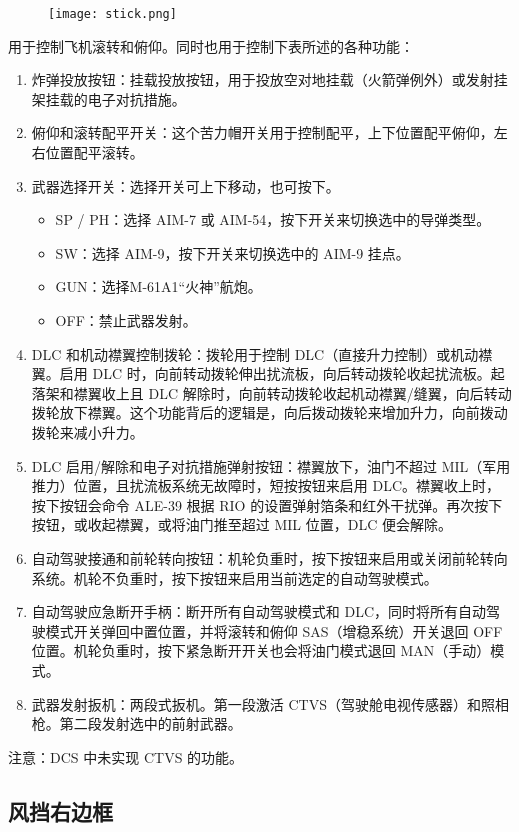 \begin{figure}[htb]
  \center
  \texttt{[image: stick.png]}
\end{figure}
用于控制飞机滚转和俯仰。同时也用于控制下表所述的各种功能：

\begin{enumerate}
  \item 炸弹投放按钮：挂载投放按钮，用于投放空对地挂载（火箭弹例外）或发射挂架挂载的电子对抗措施。
  \item 俯仰和滚转配平开关：这个苦力帽开关用于控制配平，上下位置配平俯仰，左右位置配平滚转。
  \item 武器选择开关：选择开关可上下移动，也可按下。
  \begin{itemize}
    \item SP / PH：选择 AIM-7 或 AIM-54，按下开关来切换选中的导弹类型。
    \item SW：选择 AIM-9，按下开关来切换选中的 AIM-9 挂点。
    \item GUN：选择M-61A1“火神”航炮。
    \item OFF：禁止武器发射。
  \end{itemize}
  \item DLC 和机动襟翼控制拨轮：拨轮用于控制 DLC（直接升力控制）或机动襟翼。启用 DLC 时，向前转动拨轮伸出扰流板，向后转动拨轮收起扰流板。起落架和襟翼收上且 DLC 解除时，向前转动拨轮收起机动襟翼/缝翼，向后转动拨轮放下襟翼。这个功能背后的逻辑是，向后拨动拨轮来增加升力，向前拨动拨轮来减小升力。
  \item DLC 启用/解除和电子对抗措施弹射按钮：襟翼放下，油门不超过 MIL（军用推力）位置，且扰流板系统无故障时，短按按钮来启用 DLC。襟翼收上时，按下按钮会命令 ALE-39 根据 RIO 的设置弹射箔条和红外干扰弹。再次按下按钮，或收起襟翼，或将油门推至超过 MIL 位置，DLC 便会解除。
  \item 自动驾驶接通和前轮转向按钮：机轮负重时，按下按钮来启用或关闭前轮转向系统。机轮不负重时，按下按钮来启用当前选定的自动驾驶模式。
  \item 自动驾驶应急断开手柄：断开所有自动驾驶模式和 DLC，同时将所有自动驾驶模式开关弹回中置位置，并将滚转和俯仰 SAS（增稳系统）开关退回 OFF 位置。机轮负重时，按下紧急断开开关也会将油门模式退回 MAN（手动）模式。
  \item 武器发射扳机：两段式扳机。第一段激活 CTVS（驾驶舱电视传感器）和照相枪。第二段发射选中的前射武器。
\end{enumerate}
注意：DCS 中未实现 CTVS 的功能。

\subsection{风挡右边框}

